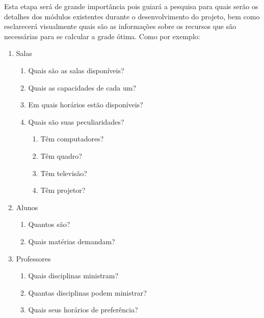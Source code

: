 
    Esta etapa será de grande importância pois guiará a pesquisa para quais serão os detalhes dos módulos existentes durante o desenvolvimento do projeto, bem como esclarecerá visualmente quais são as informações sobre os recursos que são necessárias para se calcular a grade ótima. Como por exemplo:


    \begin{enumerate}
        \item Salas
        \begin{enumerate}
            \item Quais são as salas disponíveis?
            \item Quais as capacidades de cada um?
            \item Em quais horários estão disponíveis?
            \item Quais são suas peculiaridades?
            \begin{enumerate}
                \item Têm computadores?
                \item Têm quadro?
                \item Têm televisão?
                \item Têm projetor?
            \end{enumerate}
        \end{enumerate}
        \item Alunos
        \begin{enumerate}
            \item Quantos são?
            \item Quais matérias demandam?
        \end{enumerate}
        \item Professores
        \begin{enumerate}
            \item Quais disciplinas ministram?
            \item Quantas disciplinas podem ministrar?
            \item Quais seus horários de preferência?
        \end{enumerate}
    \end{enumerate}



